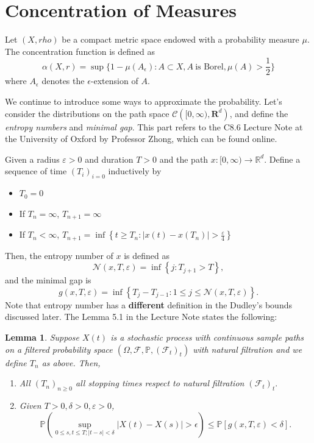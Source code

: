 \documentclass[11pt,english]{smfart}
\newtheorem{lemma}[theorem]{Lemma}
\newcommand{\mb}{\mathbb}
\newcommand{\mf}{\mathbf}
\begin{document}
\newpage
\section{Concentration of Measures}

Let $(X,rho)$ be a compact metric space endowed with a probability measure $\mu$. The concentration function is defined as $$\alpha ( X, r) = \sup \{ 1- \mu(A_\epsilon) : A\subset X, A\  \text{is Borel}, \mu(A)> \frac{1}{2}\}$$
where $A_\epsilon$ denotes the $\epsilon$-extension of $A$.

We continue to introduce some ways to approximate the probability. Let's consider the distributions on the path space $\displaystyle{\mathcal{C}\left([0,\infty),\mf{R}^d\right)}$, and define the \textit{entropy numbers} and \textit{minimal gap}. This part refers to the C8.6 Lecture Note at the University of Oxford by Professor Zhong, which can be found online.

Given a radius $\varepsilon > 0$ and duration $T>0$ and the path $x:[0,\infty)\rightarrow \mathbb{R}^d$. Define a sequence of time $(T_i)_{i=0}$ inductively by 
\begin{itemize}
    \item $T_0 = 0 $
    \item If $T_n = \infty$, $T_{n+1} = \infty$
    \item If $T_n < \infty$, $\displaystyle{T_{n+1} = \inf \left\{ t \geq T_n: |x(t)-x(T_n)| > \frac{\varepsilon}{4}\right\}} $
\end{itemize}
Then, the entropy number of $x$ is defined as $$\mathcal{N}(x,T,\varepsilon) = \inf\left\{j: T_{j+1} > T\right\} ,$$
and the minimal gap is $$g(x,T,\varepsilon) = \inf\left\{T_{j}-T_{j-1} : 1\leq j\leq \mathcal{N}(x,T,\varepsilon)\right\}.$$
Note that entropy number has a \textbf{different} definition in the Dudley's bounds discussed later. The Lemma 5.1 in the Lecture Note states the following:\\

\begin{lemma}
    Suppose $X(t)$ is a stochastic process with continuous sample paths on a filtered probability space $(\Omega, \mathcal{F},\mb{P}, (\mathcal{F}_t)_t)$ with natural filtration and we define $T_n$ as above. Then, 
    \begin{enumerate}
        \item All $(T_n)_{n\geq 0}$ all stopping times respect to natural filtration $(\mathcal{F}_t)_t.$
        \item Given $T>0,\delta > 0, \varepsilon >0$, $$\mb{P}\left(\sup_{0\leq s,t\leq T ; |t-s|<\delta}|X(t)-X(s)| > \epsilon\right)\leq \mb{P}[g(x,T,\varepsilon) < \delta].$$
    \end{enumerate}
\end{lemma}
\end{document}

